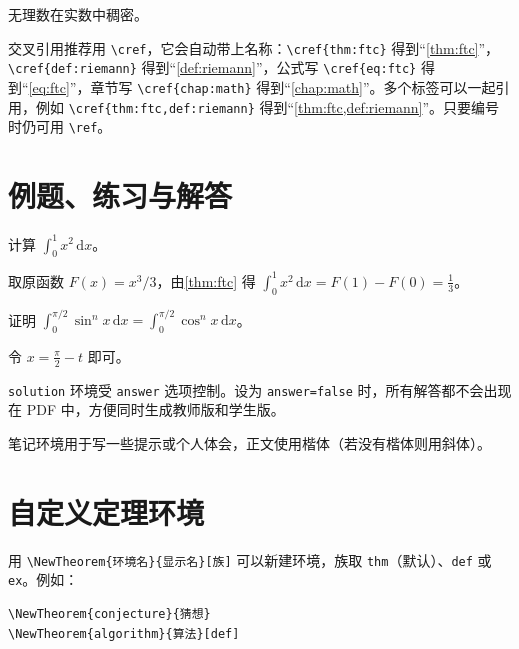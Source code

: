 \documentclass[lang=cn, theme=blue, thmstyle=fancy, twoside]{mingbook}
\begin{document}
\begin{proposition*}
无理数在实数中稠密。
\end{proposition*}

交叉引用推荐用 \verb|\cref|，它会自动带上名称：\verb|\cref{thm:ftc}| 得到“\cref{thm:ftc}”，\verb|\cref{def:riemann}| 得到“\cref{def:riemann}”，公式写 \verb|\cref{eq:ftc}| 得到“\cref{eq:ftc}”，章节写 \verb|\cref{chap:math}| 得到“\cref{chap:math}”。多个标签可以一起引用，例如 \verb|\cref{thm:ftc,def:riemann}| 得到“\cref{thm:ftc,def:riemann}”。只要编号时仍可用 \verb|\ref|。

\section{例题、练习与解答}

\begin{example}
计算 $\displaystyle\int_0^1 x^2\,\mathrm{d}x$。
\end{example}

\begin{solution}
取原函数 $F(x)=x^3/3$，由\cref{thm:ftc} 得 $\int_0^1 x^2\,\mathrm{d}x = F(1)-F(0) = \frac{1}{3}$。
\end{solution}

\begin{exercise}[换元积分]
证明 $\displaystyle\int_0^{\pi/2}\sin^n x\,\mathrm{d}x=\int_0^{\pi/2}\cos^n x\,\mathrm{d}x$。
\end{exercise}

\begin{solution}
令 $x=\frac{\pi}{2}-t$ 即可。
\end{solution}

\begin{remark}
\texttt{solution} 环境受 \texttt{answer} 选项控制。设为 \texttt{answer=false} 时，所有解答都不会出现在 PDF 中，方便同时生成教师版和学生版。
\end{remark}

\begin{note}
笔记环境用于写一些提示或个人体会，正文使用楷体（若没有楷体则用斜体）。
\end{note}

\section{自定义定理环境}

用 \verb|\NewTheorem{环境名}{显示名}[族]| 可以新建环境，族取 \texttt{thm}（默认）、\texttt{def} 或 \texttt{ex}。例如：
\begin{verbatim}
\NewTheorem{conjecture}{猜想}
\NewTheorem{algorithm}{算法}[def]
\end{verbatim}
\end{document}
